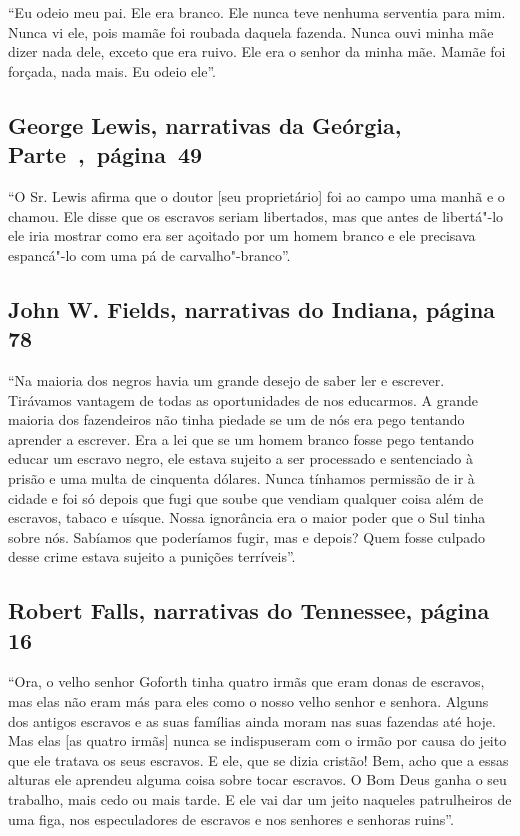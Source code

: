 ``Eu odeio meu pai. Ele era branco. Ele nunca teve nenhuma serventia
para mim. Nunca vi ele, pois mamãe foi roubada daquela fazenda. Nunca
ouvi minha mãe dizer nada dele, exceto que era ruivo. Ele era o senhor
da minha mãe. Mamãe foi forçada, nada mais. Eu odeio ele''.

\subsection{George Lewis, narrativas da Geórgia, Parte~,~página~49}
\label{ref174}

``O Sr. Lewis afirma que o doutor {[}seu proprietário{]} foi ao campo
uma manhã e o chamou. Ele disse que os escravos seriam libertados, mas
que antes de libertá"-lo ele iria mostrar como era ser açoitado por um
homem branco e ele precisava espancá"-lo com uma pá de carvalho"-branco''.

\subsection{John W. Fields, narrativas do Indiana, página 78} \label{ref91}

``Na maioria dos negros havia um grande desejo de saber ler e escrever.
Tirávamos vantagem de todas as oportunidades de nos educarmos. A grande
maioria dos fazendeiros não tinha piedade se um de nós era pego tentando
aprender a escrever. Era a lei que se um homem branco fosse pego
tentando educar um escravo negro, ele estava sujeito a ser processado e
sentenciado à prisão e uma multa de cinquenta dólares. Nunca tínhamos
permissão de ir à cidade e foi só depois que fugi que soube que vendiam
qualquer coisa além de escravos, tabaco e uísque. Nossa ignorância era o
maior poder que o Sul tinha sobre nós. Sabíamos que poderíamos fugir,
mas e depois? Quem fosse culpado desse crime estava sujeito a punições
terríveis''.

\subsection{Robert Falls, narrativas do Tennessee, página 16} \label{ref88}

``Ora, o velho senhor Goforth tinha quatro irmãs que eram donas de
escravos, mas elas não eram más para eles como o nosso velho senhor e
senhora. Alguns dos antigos escravos e as suas famílias ainda moram nas
suas fazendas até hoje. Mas elas {[}as quatro irmãs{]} nunca se
indispuseram com o irmão por causa do jeito que ele tratava os seus
escravos. E ele, que se dizia cristão! Bem, acho que a essas alturas ele
aprendeu alguma coisa sobre tocar escravos. O Bom Deus ganha o seu
trabalho, mais cedo ou mais tarde. E ele vai dar um jeito naqueles
patrulheiros de uma figa, nos especuladores de escravos e nos senhores e
senhoras ruins''.

